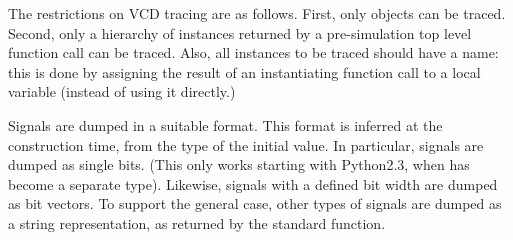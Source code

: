 \documentclass{howto}
\begin{document}
The restrictions on VCD tracing are as follows. First, only
 objects can be traced. Second, only a hierarchy of
instances returned by a pre-simulation top level function call can be
traced. Also, all instances to be traced should have a name: this is
done by assigning the result of an instantiating function call to a
local variable (instead of using it directly.)

Signals are dumped in a suitable format. This format is inferred at
the  construction time, from the type of the initial
value. In particular,  signals are dumped as single
bits. (This only works starting with Python2.3, when  has
become a separate type).  Likewise,  signals with a
defined bit width are dumped as bit vectors. To support the general
case, other types of signals are dumped as a string representation, as
returned by the standard  function.
\end{document}
